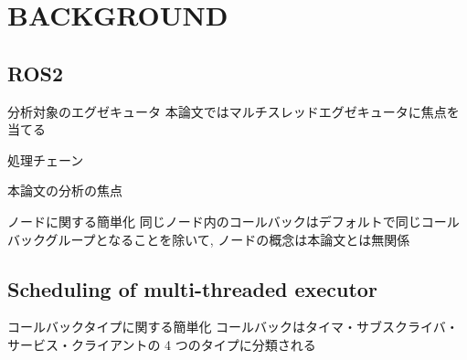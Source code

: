 

\section{BACKGROUND}
\label{sec: background}


\subsection{ROS2}
\label{ssec: ros2}

\begin{frame}{分析対象のエグゼキュータ}
    本論文ではマルチスレッドエグゼキュータに焦点を当てる
\end{frame}

\begin{frame}{処理チェーン}
\end{frame}

\begin{frame}{本論文の分析の焦点}
\end{frame}

\begin{frame}{ノードに関する簡単化}
    同じノード内のコールバックはデフォルトで同じコールバックグループとなることを除いて, ノードの概念は本論文とは無関係

\end{frame}


\subsection{Scheduling of multi-threaded executor}
\label{ssec: scheduling_of_multi_threaded_executor}

\begin{frame}{コールバックタイプに関する簡単化}
    コールバックはタイマ・サブスクライバ・サービス・クライアントの 4 つのタイプに分類される
\end{frame}

